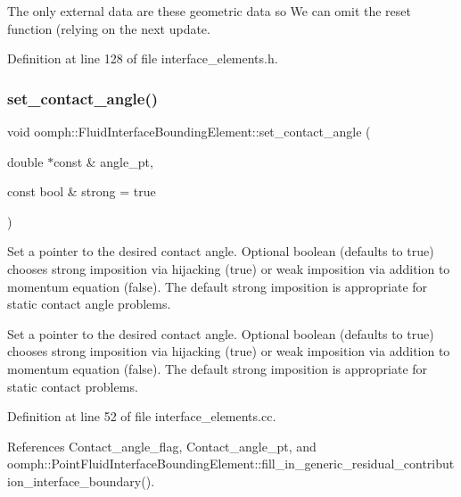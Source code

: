 The only external data are these geometric data so We can omit the reset function (relying on the next update. 



Definition at line 128 of file interface\+\_\+elements.\+h.

\mbox{\label{classoomph_1_1FluidInterfaceBoundingElement_a8566c5bed5c87717fcb155d398ed8c8f}} 
\subsubsection{\texorpdfstring{set\+\_\+contact\+\_\+angle()}{set\_contact\_angle()}}
{\footnotesize\ttfamily void oomph\+::\+Fluid\+Interface\+Bounding\+Element\+::set\+\_\+contact\+\_\+angle (\begin{DoxyParamCaption}\item[{double $\ast$const \&}]{angle\+\_\+pt,  }\item[{const bool \&}]{strong = {\ttfamily true} }\end{DoxyParamCaption})}



Set a pointer to the desired contact angle. Optional boolean (defaults to true) chooses strong imposition via hijacking (true) or weak imposition via addition to momentum equation (false). The default strong imposition is appropriate for static contact angle problems. 

Set a pointer to the desired contact angle. Optional boolean (defaults to true) chooses strong imposition via hijacking (true) or weak imposition via addition to momentum equation (false). The default strong imposition is appropriate for static contact problems. 

Definition at line 52 of file interface\+\_\+elements.\+cc.



References Contact\+\_\+angle\+\_\+flag, Contact\+\_\+angle\+\_\+pt, and oomph\+::\+Point\+Fluid\+Interface\+Bounding\+Element\+::fill\+\_\+in\+\_\+generic\+\_\+residual\+\_\+contribution\+\_\+interface\+\_\+boundary().



